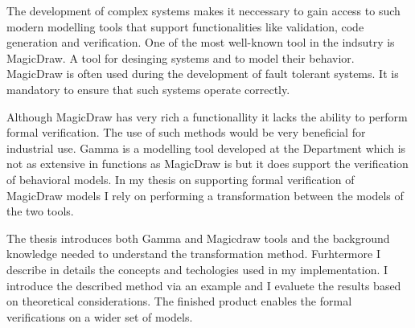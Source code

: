 The development of complex systems makes it neccessary to gain access to such modern modelling tools that support functionalities like validation, code generation and verification. One of the most well-known tool in the indsutry is MagicDraw. A tool for desinging systems and to model their behavior. MagicDraw is often used during the development of fault tolerant systems. It is mandatory to ensure that such systems operate correctly.

Although MagicDraw has very rich a functionallity it lacks the ability to perform formal verification. The use of such methods would be very beneficial for industrial use. Gamma is a modelling tool developed at the Department which is not as extensive in functions as MagicDraw is but it does support the verification of behavioral models. In my thesis on supporting formal verification of MagicDraw models I rely on performing a transformation between the models of the two tools.

The thesis introduces both Gamma and Magicdraw tools and the background knowledge needed to understand the transformation method. Furhtermore I describe in details the concepts and techologies used in my implementation. I introduce the described method via an example and I evaluete the results based on theoretical considerations. The finished product enables the formal verifications on a wider set of models.


\vfill
\selectthesislanguage

\setcounter{romanPage}{\value{page}}
